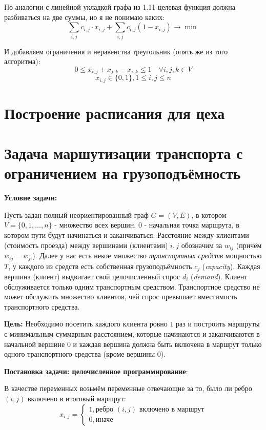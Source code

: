\documentclass[%
10pt, %
final, %
oneside, %
onecolumn, %
centertags]{article} %
\theoremstyle{plain}
\theoremstyle{definition}
\theoremstyle{remark}
\begin{document}
По аналогии с линейной укладкой графа из 1.11 целевая функция должна разбиваться на две суммы, но я не понимаю каких:
$$\sum\limits_{i,j} c_{i,j} \cdot x_{i,j} + \sum\limits_{i,j}c_{i,j}(1-x_{i,j}) \to \min$$

И добавляем ограничения и неравенства треугольник (опять же из того алгоритма):
$$0 \leqslant x_{i,j} + x_{j,k} - x_{i,k} \leqslant 1 \quad \forall i,j,k \in V$$
$$x_{i,j} \in \{0,1\}, 1 \leqslant i, j \leqslant n$$

\section{Построение расписания для цеха}

\newpage

\section{Задача маршутизации транспорта с ограничением на грузоподъёмность}

\textbf{Условие задачи:}

Пусть задан полный неориентированный граф $G = (V, E)$, в котором $V = \{0, 1, \ldots, n\}$ - множество всех вершин, $0$ - начальная точка маршрута, в котором пути будут начинаться и заканчиваться. Расстояние между клиентами (стоимость проезда) между вершинами (клиентами) $i, j$ обозначим за $w_{ij}$ (причём $w_{ij} = w_{ji}$). Далее у нас есть некое множество \textit{транспортных средств} мощностью $T$, у каждого из средств есть собственная грузоподъёмность $c_j$ (\textit{capacity}). Каждая вершина (клиент) выдвигает свой целочисленный спрос $d_i$ (\textit{demand}). Клиент обслуживается только одним транспортным средством. Транспортное средство не может обслужить множество клиентов, чей спрос превышает вместимость транспортного средства.

\textbf{Цель:}
Необходимо посетить каждого клиента ровно $1$ раз и построить маршруты с минимальным суммарным расстоянием, которые начинаются и заканчиваются в начальной вершине $0$ и каждая вершина должна быть включена в маршрут только одного транспортного средства (кроме вершины $0$).

\textbf{Постановка задачи: целочисленное программирование}:

В качестве переменных возьмём переменные отвечающие за то, было ли ребро $(i, j)$ включено в итоговый маршрут:
$$x_{i, j} = \begin{cases}
	1, \text{ребро } (i, j) \text{ включено в маршрут}\\
	0, \text{иначе}
\end{cases}$$
\end{document}
